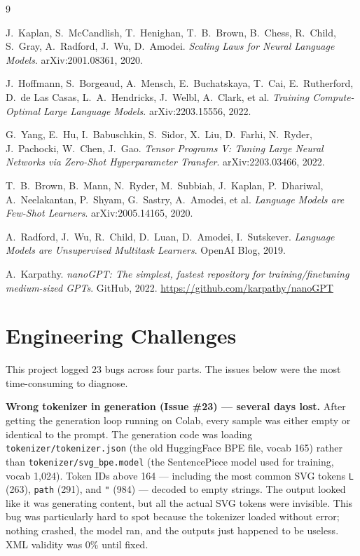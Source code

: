 \documentclass[10pt,letterpaper]{article}
\begin{document}
\begin{thebibliography}{9}

  J.\ Kaplan, S.\ McCandlish, T.\ Henighan, T.\ B.\ Brown, B.\ Chess,
  R.\ Child, S.\ Gray, A.\ Radford, J.\ Wu, D.\ Amodei.
  \textit{Scaling Laws for Neural Language Models}.
  arXiv:2001.08361, 2020.

  J.\ Hoffmann, S.\ Borgeaud, A.\ Mensch, E.\ Buchatskaya, T.\ Cai,
  E.\ Rutherford, D.\ de Las Casas, L.\ A.\ Hendricks, J.\ Welbl, A.\ Clark,
  et al.
  \textit{Training Compute-Optimal Large Language Models}.
  arXiv:2203.15556, 2022.

  G.\ Yang, E.\ Hu, I.\ Babuschkin, S.\ Sidor, X.\ Liu, D.\ Farhi,
  N.\ Ryder, J.\ Pachocki, W.\ Chen, J.\ Gao.
  \textit{Tensor Programs V: Tuning Large Neural Networks via Zero-Shot
  Hyperparameter Transfer}.
  arXiv:2203.03466, 2022.

  T.\ B.\ Brown, B.\ Mann, N.\ Ryder, M.\ Subbiah, J.\ Kaplan, P.\ Dhariwal,
  A.\ Neelakantan, P.\ Shyam, G.\ Sastry, A.\ Amodei, et al.
  \textit{Language Models are Few-Shot Learners}.
  arXiv:2005.14165, 2020.

  A.\ Radford, J.\ Wu, R.\ Child, D.\ Luan, D.\ Amodei, I.\ Sutskever.
  \textit{Language Models are Unsupervised Multitask Learners}.
  OpenAI Blog, 2019.

  A.\ Karpathy.
  \textit{nanoGPT: The simplest, fastest repository for training/finetuning
  medium-sized GPTs}.
  GitHub, 2022. \url{https://github.com/karpathy/nanoGPT}

\end{thebibliography}

\appendix
\section{Engineering Challenges}
\label{sec:challenges}

This project logged 23 bugs across four parts. The issues below were the
most time-consuming to diagnose.

\textbf{Wrong tokenizer in generation (Issue \#23) — several days lost.}
After getting the generation loop running on Colab, every sample was
either empty or identical to the prompt. The generation code was loading
\texttt{tokenizer/tokenizer.json} (the old HuggingFace BPE file, vocab 165)
rather than \texttt{tokenizer/svg\_bpe.model} (the SentencePiece model
used for training, vocab 1,024). Token IDs above 164 — including the
most common SVG tokens \texttt{L} (263), \texttt{path} (291), and
\texttt{"} (984) — decoded to empty strings. The output looked like it was
generating content, but all the actual SVG tokens were invisible. This bug
was particularly hard to spot because the tokenizer loaded without error;
nothing crashed, the model ran, and the outputs just happened to be useless.
XML validity was 0\% until fixed.
\end{document}
